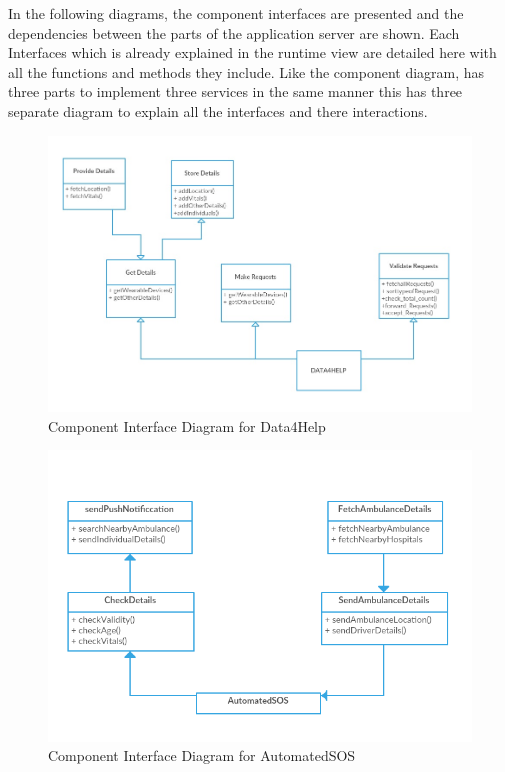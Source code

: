In the following diagrams, the component interfaces are presented and the dependencies between the parts of the application server are shown. Each Interfaces which is already explained in the runtime view are detailed here with all the functions and methods they include. Like the component diagram, has three parts to implement three services in the same manner this has three separate diagram to explain all the interfaces and there interactions.
\begin{figure}[H]
	\begin{center}
		\includegraphics[width=\textwidth]{./DD_Diagrams/InterfaceData4Help.jpg}
      \caption{Component Interface Diagram for Data4Help}
        \label{TrackMe_int1}
	\end{center}
\end{figure}
\begin{figure}[H]
	\begin{center}
		\includegraphics[width=\textwidth]{./DD_Diagrams/InterfaceAutomatedSOS.png}
      \caption{Component Interface Diagram for AutomatedSOS}
        \label{TrackMe_int2}
	\end{center}
\end{figure}
